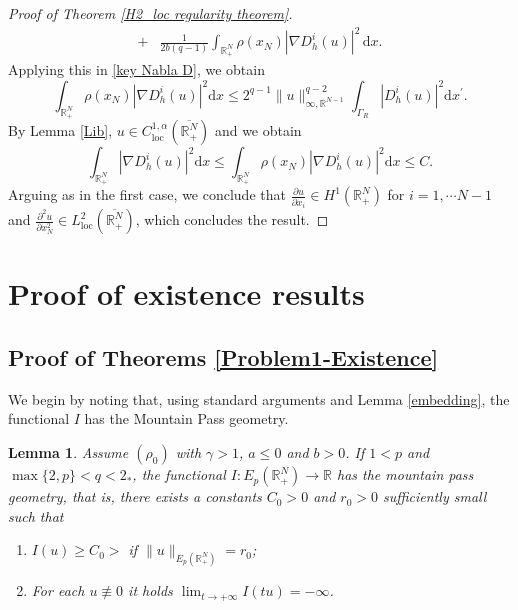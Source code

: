 \documentclass[12pt,reqno]{amsart}
\newtheorem{lemma}[theorem]{Lemma}
\begin{document}
\begin{proof}[Proof of Theorem \ref{H2_loc regularity theorem}]
\begin{align*}
        +& \frac{1}{2b(q-1)}\int_{\mathds{R}^{N}_+}\rho(x_N) |\nabla D_h^i(u)|^2\,\mathrm{d}x.
\end{align*}
Applying this in \eqref{key Nabla D}, we obtain
\begin{equation*}
    \int_{\mathds{R}^N_+}\rho(x_N)|\nabla D_h^i(u)|^2\mathrm{d}x \leq 2^{q-1}\|u\|^{q-2}_{\infty,\mathds{R}^{N-1}}\int_{\Gamma_R}|D_h^i(u)|^2\mathrm{d}x^\prime.
\end{equation*}
By Lemma \ref{Lib}, $u \in C^{1,\alpha}_{\mathrm{loc}}(\overline{\mathds{R}^N_+})$ and we obtain 
\begin{equation*}
\int_{\mathds{R}^N_+}|\nabla D_h^i(u)|^2\mathrm{d}x\leq \int_{\mathds{R}^N_+}\rho(x_N)|\nabla D_h^i(u)|^2\mathrm{d}x\leq C.
\end{equation*}
Arguing as in the first case, we conclude that $\frac{\partial u}{\partial x_i} \in H^1(\mathds{R}^N_+)$ for $i=1,\cdots N-1$ and $\frac{\partial^2u}{\partial x_N^2}\in L^2_{\mathrm{loc}}(\overline{\mathds{R}^N_+})$, which concludes the result.
\end{proof}


\section{Proof of existence results}

\subsection{Proof of Theorems \ref{Problem1-Existence}} We begin by noting that, using standard arguments and Lemma \ref{embedding}, the functional $I$ has the Mountain Pass geometry.

 \begin{lemma}\label{mp geometry} Assume $(\rho_0)$ with $\gamma>1$, $a\leq0$ and $b>0$. If $1<p$ and $\max\{2,p\}<q<2_\ast$, the functional $I:E_p(\mathds{R}^N_+)\longrightarrow \mathds{R}$ has the mountain pass geometry, that is, there exists a constants $C_0>0$ and $r_0>0$ sufficiently small such that 
 \begin{enumerate}
     \item [$(i)$] $I(u)\geq C_0>$ if $\|u\|_{E_p(\mathds{R}^N_+)}=r_0$;
      \item [$(ii)$] For each $u\not\equiv0$ it holds $\displaystyle\lim_{t\longrightarrow+\infty} I(tu)=-\infty$.
 \end{enumerate}
   \end{lemma}
\end{document}

